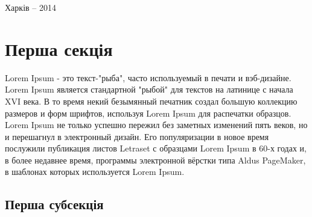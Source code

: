 \documentclass[a4paper, 14pt]{article}
\begin{document}
\begin{center}
Харків -- 2014 
\end{center}

\newpage
\newpage %

\renewcommand{\contentsname}{\normalsize ЗМІСТ} %

\tableofcontents %

\newpage %
\section{Перша секція}
Lorem Ipsum - это текст-"рыба", часто используемый в печати и вэб-дизайне. Lorem Ipsum является стандартной "рыбой" для текстов на латинице с начала XVI века. В то время некий безымянный печатник создал большую коллекцию размеров и форм шрифтов, используя Lorem Ipsum для распечатки образцов. Lorem Ipsum не только успешно пережил без заметных изменений пять веков, но и перешагнул в электронный дизайн. Его популяризации в новое время послужили публикация листов Letraset с образцами Lorem Ipsum в 60-х годах и, в более недавнее время, программы электронной вёрстки типа Aldus PageMaker, в шаблонах которых используется Lorem Ipsum.
\subsection{Перша субсекція}
\end{document}
